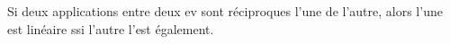 Si deux applications entre deux ev sont réciproques l'une de l'autre, alors l'une est linéaire ssi l'autre l'est également.

\begin{reponses}
\end{reponses}

